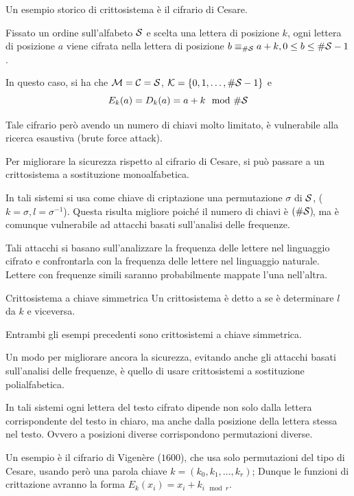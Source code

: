 \begin{example}{}
  Un esempio storico di crittosistema è il cifrario di Cesare.

  Fissato un ordine sull'alfabeto \(\mathcal{S}\) e scelta una lettera di posizione \(k\), ogni lettera di posizione \(a\) viene cifrata nella lettera di posizione \(b \equiv_{\# \mathcal{S}} a+k,  0\leq b\leq \# \mathcal{S} -1\).

  In questo caso, si ha che \(\mathcal{M} = \mathcal{C} = \mathcal{S}\), \(\mathcal{K} = \set{0, 1, \ldots, \#\SCal - 1}\) e
  \[E_k(a) = D_k(a) = a + k \mod \#\mathcal{S}\]

  Tale cifrario però avendo un numero di chiavi molto limitato, è vulnerabile alla ricerca esaustiva (brute force attack).
\end{example}

Per migliorare la sicurezza rispetto al cifrario di Cesare, si può passare a un crittosistema a sostituzione monoalfabetica.

In tali sistemi si usa come chiave di criptazione una permutazione \(\sigma\) di \(\mathcal{S}\),  (\(k = \sigma, l = \sigma^{-1}\)).
Questa risulta migliore poiché il numero di chiavi è \((\#\mathcal{S})\!\), ma è comunque vulnerabile ad attacchi basati sull'analisi delle frequenze.

Tali attacchi si basano sull'analizzare la frequenza delle lettere nel linguaggio cifrato e confrontarla con la frequenza delle lettere nel linguaggio naturale.
Lettere con frequenze simili saranno probabilmente mappate l'una nell'altra.

\begin{definition}{Crittosistema a chiave simmetrica}
  Un crittosistema è detto a  se è  determinare \(l\) da \(k\) e viceversa.
\end{definition}

Entrambi gli esempi precedenti sono crittosistemi a chiave simmetrica.

Un modo per migliorare ancora la sicurezza, evitando anche gli attacchi basati sull'analisi delle frequenze, è quello di usare crittosistemi a sostituzione polialfabetica.

In tali sistemi ogni lettera del testo cifrato dipende non solo dalla lettera corrispondente del testo in chiaro, ma anche dalla posizione della lettera stessa nel testo.
Ovvero a posizioni diverse corrispondono permutazioni diverse.

Un esempio è il cifrario di Vigenère (\(1600\)), che usa solo permutazioni del tipo di Cesare, usando però una parola chiave \(k = (k_0, k_1, \ldots, k_r)\); Dunque le funzioni di crittazione avranno la forma \(E_k(x_i) = x_i + k_{i \mod r}\).

